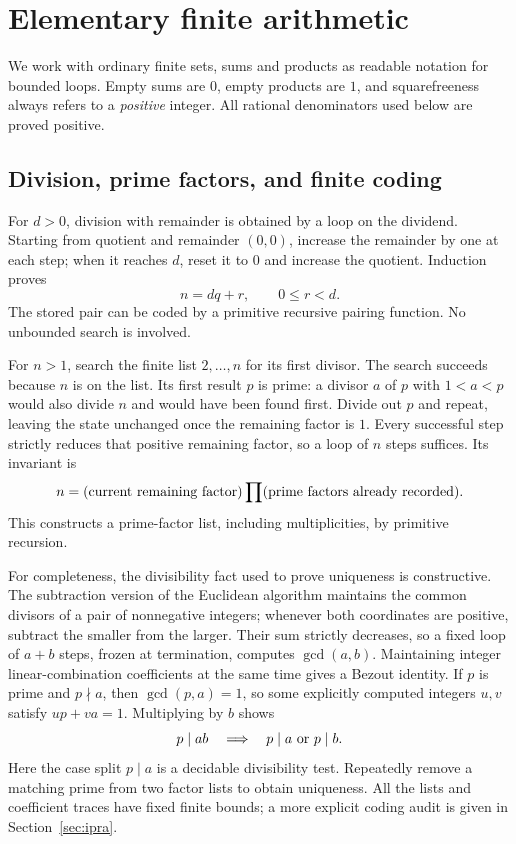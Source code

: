 \section{Elementary finite arithmetic}
\label{sec:finite}

We work with ordinary finite sets, sums and products as readable notation
for bounded loops. Empty sums are \(0\), empty products are \(1\), and
squarefreeness always refers to a \emph{positive} integer.
All rational denominators used below are proved positive.

\subsection{Division, prime factors, and finite coding}

For \(d>0\), division with remainder is obtained by a loop on the dividend.
Starting from quotient and remainder \((0,0)\), increase the remainder by
one at each step; when it reaches \(d\), reset it to \(0\) and increase
the quotient. Induction proves
\[
 n=dq+r,\qquad 0\le r<d.
\]
The stored pair can be coded by a primitive recursive pairing function.
No unbounded search is involved.

For \(n>1\), search the finite list \(2,\ldots,n\) for its first divisor.
The search succeeds because \(n\) is on the list. Its first result \(p\)
is prime: a divisor \(a\) of \(p\) with \(1<a<p\) would also divide \(n\)
and would have been found first. Divide out \(p\) and repeat, leaving the
state unchanged once the remaining factor is \(1\). Every successful step
strictly reduces that positive remaining factor, so a loop of \(n\) steps
suffices. Its invariant is
\[
 n=(\hbox{current remaining factor})
       \prod(\hbox{prime factors already recorded}).
\]
This constructs a prime-factor list, including multiplicities, by primitive
recursion.

For completeness, the divisibility fact used to prove uniqueness is
constructive. The subtraction version of the Euclidean algorithm maintains
the common divisors of a pair of nonnegative integers; whenever both
coordinates are positive, subtract the smaller from the larger. Their sum
strictly decreases, so a fixed loop of \(a+b\) steps, frozen at termination,
computes \(\gcd(a,b)\). Maintaining integer linear-combination coefficients
at the same time gives a Bezout identity. If \(p\) is prime and \(p\nmid a\),
then \(\gcd(p,a)=1\), so some explicitly computed integers \(u,v\) satisfy
\(up+va=1\). Multiplying by \(b\) shows
\[
 p\mid ab\quad\Longrightarrow\quad p\mid a\ \hbox{or}\ p\mid b.
\]
Here the case split \(p\mid a\) is a decidable divisibility test. Repeatedly
remove a matching prime from two factor lists to obtain uniqueness.
All the lists and coefficient traces have fixed finite bounds; a more
explicit coding audit is given in Section~\ref{sec:ipra}.

